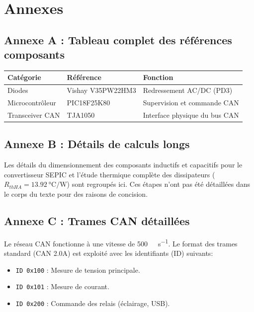 \chapter*{Annexes}
\label{annexes}
{}

\section*{Annexe A : Tableau complet des références composants}
\begin{tableau}[H]
    \centering
    \begin{tabular}{|l|l|l|}
        \hline
        \textbf{Catégorie} & \textbf{Référence} & \textbf{Fonction} \\
        \hline
        Diodes & Vishay V35PW22HM3 & Redressement AC/DC (PD3) \\
        \hline
        Microcontrôleur & PIC18F25K80 & Supervision et commande CAN \\
        \hline
        Transceiver CAN & TJA1050 & Interface physique du bus CAN \\
        \hline
    \end{tabular}
    \caption{Extrait de la nomenclature (BOM) détaillée.}
\end{tableau}

\section*{Annexe B : Détails de calculs longs}
Les détails du dimensionnement des composants inductifs et capacitifs pour le convertisseur SEPIC et l'étude thermique complète des dissipateurs ($R_{thHA} = \SI{13.92}{\celsius\per\watt}$) sont regroupés ici. Ces étapes n'ont pas été détaillées dans le corps du texte pour des raisons de concision.

\section*{Annexe C : Trames CAN détaillées}
Le réseau CAN fonctionne à une vitesse de \SI{500}{\kilo\bit\per\second}. Le format des trames standard (CAN 2.0A) est exploité avec les identifiants (ID) suivants:
\begin{itemize}
    \item \texttt{ID 0x100} : Mesure de tension principale.
    \item \texttt{ID 0x101} : Mesure de courant.
    \item \texttt{ID 0x200} : Commande des relais (éclairage, USB).
\end{itemize}

